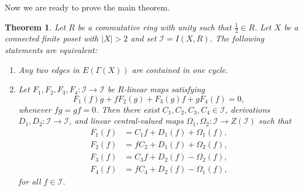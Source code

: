 \documentclass[reqno]{amsart}
\numberwithin{equation}{section}
\theoremstyle{plain}
\newtheorem{theorem}{Theorem}[section]
\theoremstyle{definition}
\newcommand{\I}{\mathcal I}
\begin{document}
Now we are ready to prove the main theorem.

\begin{theorem}\label{thm:main-characterization}
Let $R$ be a commutative ring with unity such that $\frac{1}{2}\in R$.
Let $X$ be a connected finite poset with $|X|>2$ and set $\I=I(X,R)$.
The following statements are equivalent:
\begin{enumerate}
\item[(i)] Any two edges in $E(\Gamma(X))$ are contained in one cycle.
\item[(ii)] Let $F_1,F_2,F_3,F_4:\I\to\I$ be $R$-linear maps satisfying
\begin{equation}\label{eq:four-map-local}
F_1(f)g+fF_2(g)+F_3(g)f+gF_4(f)=0,
\end{equation}
whenever $fg=gf=0$. Then there exist
$C_1,C_2,C_3,C_4\in\I$, derivations $D_1,D_2:\I\to\I$, and linear
central-valued maps $\Omega_1,\Omega_2:\I\to Z(\I)$ such that
\begin{equation}\label{eq:four-map-standard}
\begin{aligned}
F_1(f)&=C_1f+D_1(f)+\Omega_1(f),\\
F_2(f)&=fC_2+D_1(f)+\Omega_2(f),\\
F_3(f)&=C_3f+D_2(f)-\Omega_2(f),\\
F_4(f)&=fC_4+D_2(f)-\Omega_1(f),
\end{aligned}
\end{equation}
for all $f\in\I$.
\end{enumerate}
\end{theorem}
\end{document}
